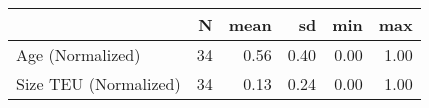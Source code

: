 
\begin{tabular}[t]{lrrrrr}
\toprule
  & N & mean & sd & min & max\\
\midrule
Age (Normalized) & 34 & 0.56 & 0.40 & 0.00 & 1.00\\
Size TEU (Normalized) & 34 & 0.13 & 0.24 & 0.00 & 1.00\\
\bottomrule
\end{tabular}
